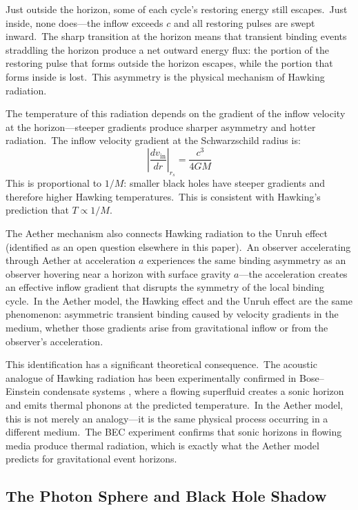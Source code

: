 ﻿\documentclass[12pt,letterpaper]{article}
\newcommand{\vin}{v_{\mathrm{in}}}
\begin{document}
Just outside the horizon, some of each cycle's restoring energy still escapes.\ Just
inside, none does---the inflow exceeds $c$ and all restoring pulses are swept inward.\ The
sharp transition at the horizon means that transient binding events straddling the horizon
produce a net outward energy flux: the portion of the restoring pulse that forms outside
the horizon escapes, while the portion that forms inside is lost.\ This asymmetry is the
physical mechanism of Hawking radiation.

The temperature of this radiation depends on the gradient of the inflow velocity at the
horizon---steeper gradients produce sharper asymmetry and hotter radiation.\ The inflow
velocity gradient at the Schwarzschild radius is:
%
\begin{equation}
  \left|\frac{d\vin}{dr}\right|_{r_s} = \frac{c^3}{4GM}
\end{equation}
%
This is proportional to $1/M$: smaller black holes have steeper gradients and therefore
higher Hawking temperatures.\ This is consistent with Hawking's prediction that
$T \propto 1/M$.

The Aether mechanism also connects Hawking radiation to the Unruh effect (identified as
an open question elsewhere in this paper).\ An observer accelerating through Aether at
acceleration $a$ experiences the same binding asymmetry as an observer hovering near a
horizon with surface gravity $a$---the acceleration creates an effective inflow gradient
that disrupts the symmetry of the local binding cycle.\ In the Aether model, the Hawking
effect and the Unruh effect are the same phenomenon: asymmetric transient binding caused
by velocity gradients in the medium, whether those gradients arise from gravitational
inflow or from the observer's acceleration.

This identification has a significant theoretical consequence.\ The acoustic analogue of
Hawking radiation has been experimentally confirmed in Bose--Einstein condensate systems
\cite{steinhauer2019}, where a flowing superfluid creates a sonic horizon and emits thermal
phonons at the predicted temperature.\ In the Aether model, this is not merely an analogy---it is the same physical process occurring in a different medium.\ The BEC experiment
confirms that sonic horizons in flowing media produce thermal radiation, which is exactly
what the Aether model predicts for gravitational event horizons.


\subsection{The Photon Sphere and Black Hole Shadow}
\end{document}
